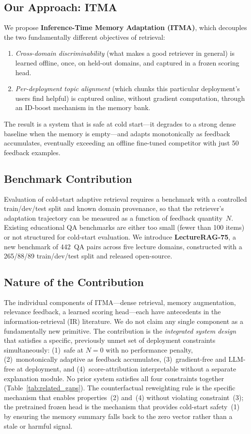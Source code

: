 \documentclass[journal]{IEEEtran}
\begin{document}
\subsection{Our Approach: ITMA}
We propose \textbf{Inference-Time Memory Adaptation (ITMA)}, which decouples
the two fundamentally different objectives of retrieval:
\begin{enumerate}
  \item \emph{Cross-domain discriminability} (what makes a good retriever in
        general) is learned offline, once, on held-out domains, and captured
        in a frozen scoring head.
  \item \emph{Per-deployment topic alignment} (which chunks this particular
        deployment's users find helpful) is captured online, without gradient
        computation, through an ID-boost mechanism in the memory bank.
\end{enumerate}
The result is a system that is safe at cold start---it degrades to a strong
dense baseline when the memory is empty---and adapts monotonically as
feedback accumulates, eventually exceeding an offline fine-tuned competitor
with just 50 feedback examples.

\subsection{Benchmark Contribution}
Evaluation of cold-start adaptive retrieval requires a benchmark with a
controlled train/dev/test split and known domain provenance, so that the
retriever's adaptation trajectory can be measured as a function of
feedback quantity~$N$.  Existing educational QA benchmarks are either too
small (fewer than 100 items) or not structured for cold-start evaluation.
We introduce \textbf{LectureRAG-75}, a new benchmark of 442~QA pairs across
five lecture domains, constructed with a 265/88/89 train/dev/test split and
released open-source.

\subsection{Nature of the Contribution}
The individual components of ITMA---dense retrieval, memory augmentation,
relevance feedback, a learned scoring head---each have antecedents in the
information-retrieval (IR) literature.  We do not claim any single component
as a fundamentally new primitive.  The contribution is the \emph{integrated
system design} that satisfies a specific, previously unmet set of deployment
constraints simultaneously: (1)~safe at $N{=}0$ with no performance penalty,
(2)~monotonically adaptive as feedback accumulates, (3)~gradient-free and
LLM-free at deployment, and (4)~score-attribution interpretable without a
separate explanation module.  No prior system satisfies all four constraints
together (Table~\ref{tab:related_gaps}).  The counterfactual reweighting
rule is the specific mechanism that enables properties~(2) and~(4) without
violating constraint~(3); the pretrained frozen head is the mechanism that
provides cold-start safety~(1) by ensuring the memory summary falls back to
the zero vector rather than a stale or harmful signal.
\end{document}

